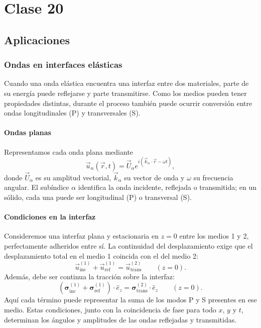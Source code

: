 \chapter{Clase 20}

\section{Aplicaciones}

\subsection{Ondas en interfaces elásticas}

Cuando una onda elástica encuentra una interfaz entre dos materiales, parte de su energía puede reflejarse y parte transmitirse. Como los medios pueden tener propiedades distintas, durante el proceso también puede ocurrir conversión entre ondas longitudinales (P) y transversales (S).

\subsubsection{Ondas planas}

Representamos cada onda plana mediante
\[
\vec u_\alpha(\vec r,t)
=\vec U_\alpha e^{i(\vec k_\alpha\cdot\vec r-\omega t)},
\]
donde $\vec U_\alpha$ es su amplitud vectorial, $\vec k_\alpha$ su vector de onda y $\omega$ su frecuencia angular. El subíndice $\alpha$ identifica la onda incidente, reflejada o transmitida; en un sólido, cada una puede ser longitudinal (P) o transversal (S).

\subsubsection{Condiciones en la interfaz}

Consideremos una interfaz plana y estacionaria en $z=0$ entre los medios 1 y 2, perfectamente adheridos entre sí. La continuidad del desplazamiento exige que el desplazamiento total en el medio 1 coincida con el del medio 2:
\[
\vec u_{\mathrm{inc}}^{(1)}+\vec u_{\mathrm{ref}}^{(1)}
=\vec u_{\mathrm{trans}}^{(2)}
\qquad (z=0).
\]
Además, debe ser continua la tracción sobre la interfaz:
\[
\left(\boldsymbol{\sigma}_{\mathrm{inc}}^{(1)}
+\boldsymbol{\sigma}_{\mathrm{ref}}^{(1)}\right)\cdot\hat e_z
=\boldsymbol{\sigma}_{\mathrm{trans}}^{(2)}\cdot\hat e_z
\qquad (z=0).
\]
Aquí cada término puede representar la suma de los modos P y S presentes en ese medio. Estas condiciones, junto con la coincidencia de fase para todo $x$, $y$ y $t$, determinan los ángulos y amplitudes de las ondas reflejadas y transmitidas.

